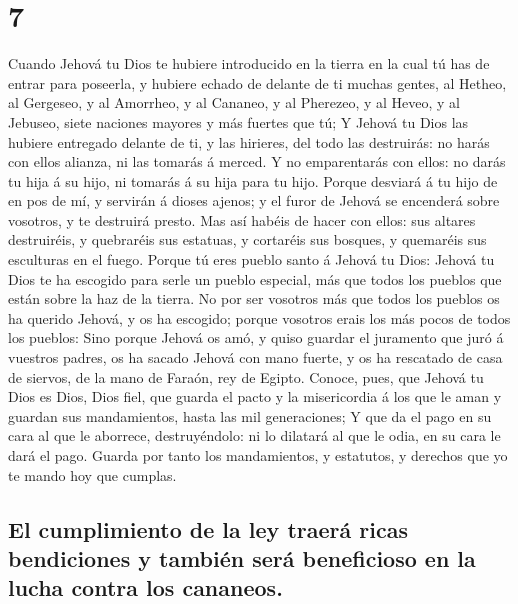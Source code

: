 \hypertarget{section-6}{%
\section{7}\label{section-6}}

 Cuando Jehová tu Dios te hubiere introducido en la tierra
en la cual tú has de entrar para poseerla, y hubiere echado de delante
de ti muchas gentes, al Hetheo, al Gergeseo, y al Amorrheo, y al
Cananeo, y al Pherezeo, y al Heveo, y al Jebuseo, siete naciones mayores
y más fuertes que tú;  Y Jehová tu Dios las hubiere
entregado delante de ti, y las hirieres, del todo las destruirás: no
harás con ellos alianza, ni las tomarás á merced.  Y no
emparentarás con ellos: no darás tu hija á su hijo, ni tomarás á su hija
para tu hijo.  Porque desviará á tu hijo de en pos de mí, y
servirán á dioses ajenos; y el furor de Jehová se encenderá sobre
vosotros, y te destruirá presto.  Mas así habéis de hacer
con ellos: sus altares destruiréis, y quebraréis sus estatuas, y
cortaréis sus bosques, y quemaréis sus esculturas en el fuego.
 Porque tú eres pueblo santo á Jehová tu Dios: Jehová tu
Dios te ha escogido para serle un pueblo especial, más que todos los
pueblos que están sobre la haz de la tierra.  No por ser
vosotros más que todos los pueblos os ha querido Jehová, y os ha
escogido; porque vosotros erais los más pocos de todos los pueblos:
 Sino porque Jehová os amó, y quiso guardar el juramento que
juró á vuestros padres, os ha sacado Jehová con mano fuerte, y os ha
rescatado de casa de siervos, de la mano de Faraón, rey de Egipto.
 Conoce, pues, que Jehová tu Dios es Dios, Dios fiel, que
guarda el pacto y la misericordia á los que le aman y guardan sus
mandamientos, hasta las mil generaciones;  Y que da el pago
en su cara al que le aborrece, destruyéndolo: ni lo dilatará al que le
odia, en su cara le dará el pago.  Guarda por tanto los
mandamientos, y estatutos, y derechos que yo te mando hoy que cumplas.

\hypertarget{el-cumplimiento-de-la-ley-traeruxe1-ricas-bendiciones-y-tambiuxe9n-seruxe1-beneficioso-en-la-lucha-contra-los-cananeos.}{%
\subsection{El cumplimiento de la ley traerá ricas bendiciones y también
será beneficioso en la lucha contra los
cananeos.}\label{el-cumplimiento-de-la-ley-traeruxe1-ricas-bendiciones-y-tambiuxe9n-seruxe1-beneficioso-en-la-lucha-contra-los-cananeos.}}

